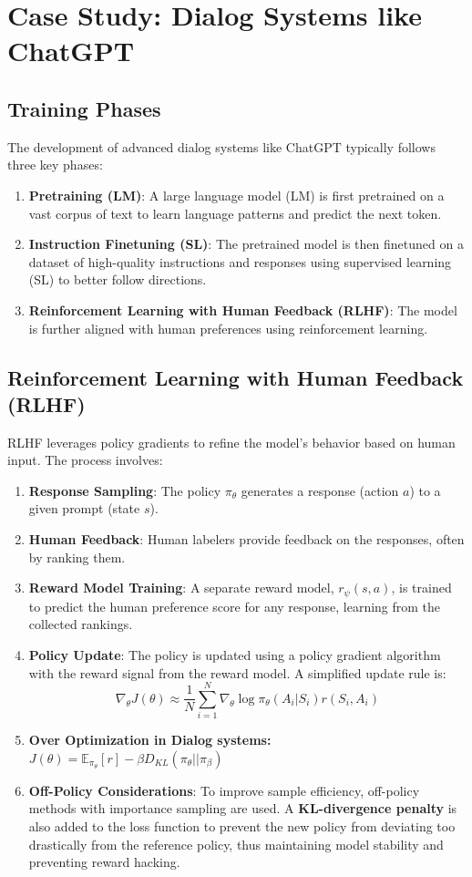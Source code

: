 \documentclass[12pt]{article}
\begin{document}
\section{Case Study: Dialog Systems like ChatGPT }

\subsection{Training Phases}
The development of advanced dialog systems like ChatGPT typically follows three key phases:
\begin{enumerate}
    \item \textbf{Pretraining (LM)}: A large language model (LM) is first pretrained on a vast corpus of text to learn language patterns and predict the next token.
    \item \textbf{Instruction Finetuning (SL)}: The pretrained model is then finetuned on a dataset of high-quality instructions and responses using supervised learning (SL) to better follow directions.
    \item \textbf{Reinforcement Learning with Human Feedback (RLHF)}: The model is further aligned with human preferences using reinforcement learning.
\end{enumerate}

\subsection{Reinforcement Learning with Human Feedback (RLHF)}
RLHF leverages policy gradients to refine the model's behavior based on human input. The process involves:
\begin{enumerate}
    \item \textbf{Response Sampling}: The policy $\pi_\theta$ generates a response (action $a$) to a given prompt (state $s$).
    \item \textbf{Human Feedback}: Human labelers provide feedback on the responses, often by ranking them.
    \item \textbf{Reward Model Training}: A separate reward model, $r_\psi(s,a)$, is trained to predict the human preference score for any response, learning from the collected rankings.
    \item \textbf{Policy Update}: The policy is updated using a policy gradient algorithm with the reward signal from the reward model. A simplified update rule is:
    $$ \nabla_\theta J(\theta) \approx \frac{1}{N} \sum_{i=1}^N \nabla_\theta \log \pi_\theta(A_i | S_i) r(S_i, A_i) $$

    \item \textbf{Over Optimization in Dialog systems:}
    $J(\theta) = \mathbb{E}_{\pi_{\theta}}[r] - \beta D_{KL}(\pi_{\theta}||\pi_{\beta})$
    
    \item \textbf{Off-Policy Considerations}: To improve sample efficiency, off-policy methods with importance sampling are used. A \textbf{KL-divergence penalty} is also added to the loss function to prevent the new policy from deviating too drastically from the reference policy, thus maintaining model stability and preventing reward hacking.
\end{enumerate}
\end{document}
